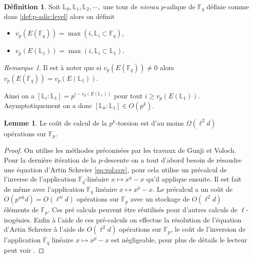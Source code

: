\documentclass[10pt,a4paper]{book}
\theoremstyle{plain}
\theoremstyle{definition}
\newtheorem{lem}[thm]{Lemme}
\theoremstyle{definition}
\theoremstyle{definition}
\theoremstyle{definition}
\newtheorem{defi}[thm]{Définition}
\theoremstyle{remark}
\newtheorem{rem}[thm]{Remarque}
\theoremstyle{remark}
\theoremstyle{definition}
\begin{document}

\begin{defi}
Soit $\mathbb{L}_0, \mathbb{L}_1, \mathbb{L}_2, \cdots, $ une tour de \emph{niveau} $p$-adique de $\mathbb{F}_q$ définie comme dans \ref{def:p-adic:level} alors on définit
\begin{itemize}
\item $v_p(E(\mathbb{F}_q))=\max\left( i, \mathbb{L}_i \subset \mathbb{F}_q \right)$,
\item $v_p(E(\mathbb{L}_1))=\max\left( i, \mathbb{L}_i \subset \mathbb{L}_1 \right)$.
\end{itemize}
\end{defi}

\begin{rem}
Il est à noter que si $v_p(E(\mathbb{F}_q)) \neq 0$ alors $v_p(E(\mathbb{F}_q))=v_p(E(\mathbb{L}_1))$.
\end{rem}

Ainsi on a $[\mathbb{L}_i:\mathbb{L}_1]=p^{i- v_p(E(\mathbb{L}_1))}$ pour tout $i \geqslant  v_p(E(\mathbb{L}_1))$. Asymptotiquement on a donc $[\mathbb{L}_k:\mathbb{L}_1] \in O(p^k)$.


\begin{lem}
Le coût de calcul de la $p^k$-torsion est d'au moins $\Omega(\ell^2d)$ opérations sur $\mathbb{F}_p$.
\end{lem}

\begin{proof}
On utilise les méthodes préconisées par les travaux de Gunji et Voloch. Pour la dernière itération de la $p$-descente on a tout d'abord besoin de résoudre une équation d'Artin Schreier \eqref{eq:vol:cov}, pour cela \cite{Couveignes96} utilise un précalcul de l'inverse de l'application $\mathbb{F}_q$-linéaire  $x \mapsto x^q-x$ qu'il applique ensuite. Il est fait de même avec l'application $\mathbb{F}_q$ linéaire $x \mapsto x^p - x$. Le précalcul a un coût de $O(p^{wk}d)=O(\ell^{w}d)$ opérations sur $\mathbb{F}_p$ avec un stockage de $O(\ell^2d)$ éléments de $\mathbb{F}_p$.
Ces pré calculs peuvent être réutilisés pour d'autres calculs de $\ell$-isogénies.
Enfin à l'aide de ces pré-calculs on effectue la résolution de l'équation d'Artin Schreier à l'aide de $O(\ell^2 d)$ opérations sur $\mathbb{F}_p$, le coût de l'inversion de l'application $\mathbb{F}_q$ linéaire $x \mapsto x^p - x$ est négligeable, pour plus de détails le lecteur peut voir \cite[§2.4]{Couveignes96}.
\end{proof}
\end{document}
